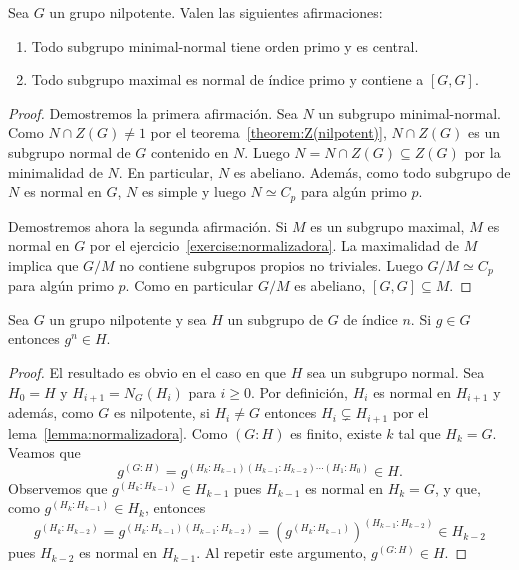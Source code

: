 \begin{theorem}
	Sea $G$ un grupo nilpotente. Valen las siguientes afirmaciones:
	\begin{enumerate}
		\item Todo subgrupo minimal-normal tiene orden primo y es central.
		\item Todo subgrupo maximal es normal de índice primo y contiene a
			$[G,G]$. 
	\end{enumerate}
\end{theorem}

\begin{proof}
	Demostremos la primera afirmación. Sea $N$ un subgrupo minimal-normal. Como
	$N\cap Z(G)\ne1$ por el teorema~\ref{theorem:Z(nilpotent)}, $N\cap Z(G)$ es
	un subgrupo normal de $G$ contenido en $N$. Luego $N=N\cap Z(G)\subseteq
	Z(G)$ por la minimalidad de $N$. En particular, $N$ es abeliano. Además,
	como todo subgrupo de $N$ es normal en $G$, $N$ es simple y luego $N\simeq
	C_p$ para algún primo $p$.

	Demostremos ahora la segunda afirmación. Si $M$ es un subgrupo maximal, $M$
	es normal en $G$ por el ejercicio~\ref{exercise:normalizadora}. La
	maximalidad de $M$ implica que $G/M$ no contiene subgrupos propios no
	triviales. Luego $G/M\simeq C_p$ para algún primo $p$. Como en particular
	$G/M$ es abeliano, $[G,G]\subseteq M$. 
\end{proof}

\begin{proposition}
	\label{proposition:g^n}
	Sea $G$ un grupo nilpotente y sea $H$ un subgrupo de $G$ de índice $n$. Si
	$g\in G$ entonces $g^n\in H$.
\end{proposition}


\begin{proof}
	El resultado es obvio en el caso en que $H$ sea un subgrupo normal.  Sea
	$H_0=H$ y $H_{i+1}=N_G(H_i)$ para $i\geq0$. Por definición, $H_{i}$ es
	normal en $H_{i+1}$ y además, como $G$ es nilpotente, si $H_i\ne G$
	entonces $H_i\subsetneq H_{i+1}$ por el lema~\ref{lemma:normalizadora}.
	Como $(G:H)$ es finito, existe $k$ tal que $H_k=G$. Veamos que 
	\[
		g^{(G:H)}=g^{(H_k:H_{k-1})(H_{k-1}:H_{k-2})\cdots (H_1:H_0)}\in H.
	\]
	Observemos que $g^{(H_k:H_{k-1})}\in H_{k-1}$ pues $H_{k-1}$ es normal en $H_k=G$, y que, como 
	$g^{(H_k:H_{k-1})}\in H_k$, entonces 
	\[
	g^{(H_k:H_{k-2})}=g^{(H_k:H_{k-1})(H_{k-1}:H_{k-2})}=\left(g^{(H_k:H_{k-1})}\right)^{(H_{k-1}:H_{k-2})}\in H_{k-2}
	\]
	pues $H_{k-2}$ es normal en $H_{k-1}$. Al repetir este argumento, $g^{(G:H)}\in H$. 
\end{proof}

